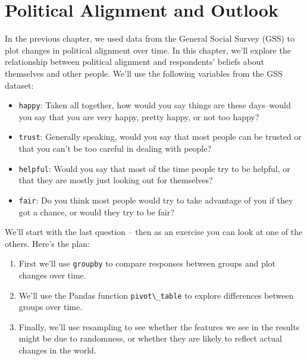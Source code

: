 \chapter{Political Alignment and
Outlook}\label{political-alignment-and-outlook}

In the previous chapter, we used data from the General Social Survey
(GSS) to plot changes in political alignment over time. In this chapter,
we'll explore the relationship between political alignment and
respondents' beliefs about themselves and other people. We'll use the
following variables from the GSS dataset:

\begin{itemize}
\item
  \passthrough{\lstinline!happy!}: Taken all together, how would you say
  things are these days--would you say that you are very happy, pretty
  happy, or not too happy?
\item
  \passthrough{\lstinline!trust!}: Generally speaking, would you say
  that most people can be trusted or that you can't be too careful in
  dealing with people?
\item
  \passthrough{\lstinline!helpful!}: Would you say that most of the time
  people try to be helpful, or that they are mostly just looking out for
  themselves?
\item
  \passthrough{\lstinline!fair!}: Do you think most people would try to
  take advantage of you if they got a chance, or would they try to be
  fair?
\end{itemize}

We'll start with the last question -- then as an exercise you can look
at one of the others. Here's the plan:

\begin{enumerate}
\def\labelenumi{\arabic{enumi}.}
\item
  First we'll use \passthrough{\lstinline!groupby!} to compare responses
  between groups and plot changes over time.
\item
  We'll use the Pandas function \passthrough{\lstinline!pivot\_table!}
  to explore differences between groups over time.
\item
  Finally, we'll use resampling to see whether the features we see in
  the results might be due to randomness, or whether they are likely to
  reflect actual changes in the world.
\end{enumerate}

